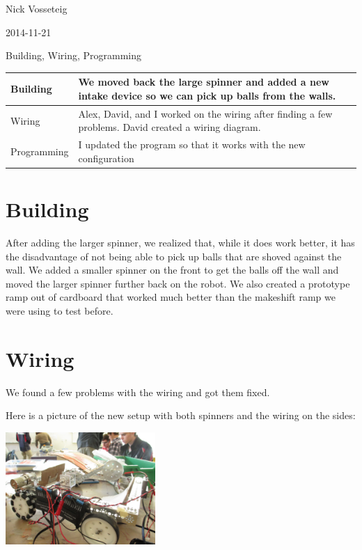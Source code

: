 Nick Vosseteig

2014-11-21

Building, Wiring, Programming

\begin{tabular}{|p{5cm}|p{5cm}|}
 \hline
 Building&
We moved back the large spinner and added a new intake device so we can pick up balls from the walls.
 \\
 \hline
Wiring&
Alex, David, and I worked on the wiring after finding a few problems. David created a wiring diagram.
 \\
 \hline
Programming&
I updated the program so that it works with the new configuration
 \\
 \hline
\end{tabular}

\section*{Building}
After adding the larger spinner, we realized that, while it does work better, it has the disadvantage of not being able to pick up balls that are shoved against the wall. We added a smaller spinner on the front to get the balls off the wall and moved the larger spinner further back on the robot. We also created a prototype ramp out of cardboard that worked much better than the makeshift ramp we were using to test before.
\section*{Wiring}
We found a few problems with the wiring and got them fixed.

Here is a picture of the new setup with both spinners and the wiring on the sides:
\begin{center}
 \includegraphics[width=215px]{./Entries/Images/RobotDesignForNovemberTwentyFirstTwoThousandAndFourteenWithIntakeLauncherAndRampWiringIncludedILoveAlexHeIsTheBestNic.JPG}
\end{center}
